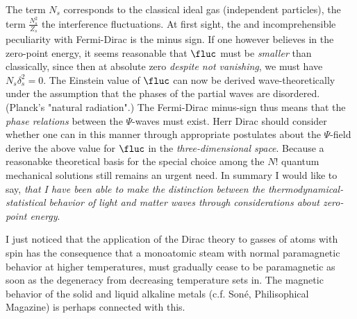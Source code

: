 \documentclass{article}
\begin{document}
The term $N_s$ corresponds to the classical ideal gas (independent particles), the term $\frac{N_s^2}{Z_s}$ the interference fluctuations. At first sight, the  and incomprehensible peculiarity with Fermi-Dirac is the minus sign. If one however believes in the zero-point energy, it seems reasonable that $\fluc$ must be \textit{smaller} than classically, since then at absolute zero \textit{despite not vanishing}, we must have $N_s\delta_s^2=0$. The Einstein value of $\fluc$ can now be derived wave-theoretically under the assumption that the phases of the partial waves are disordered. (Planck's "natural radiation".) The Fermi-Dirac minus-sign thus means that the \textit{phase relations} between the $\Psi$-waves must exist. Herr Dirac should consider whether one can in this manner through appropriate postulates about the $\Psi$-field derive the above value for $\fluc$ in the \textit{three-dimensional space}. Because a reasonabke theoretical basis for the special choice among the $N!$ quantum mechanical solutions still remains an urgent need. In summary I would like to say, \textit{that I have been able to make the distinction between the thermodynamical-statistical behavior of light and matter waves  through considerations about zero-point energy}.

I just noticed that the application of the Dirac theory to gasses of atoms with spin has the consequence that a monoatomic steam with normal paramagnetic behavior at higher temperatures, must gradually cease to be paramagnetic as soon as the degeneracy from decreasing temperature sets in. The magnetic behavior of the solid and liquid alkaline metals (c.f. Soné, Philisophical Magazine) is perhaps connected with this.
\end{document}
